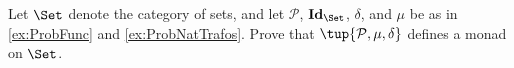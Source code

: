\documentclass[paper=8.125in:10.250in,pagesize=pdftex,
    headinclude=false,footinclude=false,oneside,egregdoesnotlikesansseriftitles]{kaobook}
\begin{document}

\newpage


\begin{gradedexercise}\label{ex:ProbMonad}
Let $\Set$ denote the category of sets, and let $\mathcal{P}$, $\mathbf{Id}_\Set$, $\delta$, and $\mu$ be as in \cref{ex:ProbFunc} and \cref{ex:ProbNatTrafos}. 
Prove that $\tup{\mathcal{P}, \mu, \delta}$ defines a monad on $\Set$. 
\end{gradedexercise}


\newpage
\end{document}
